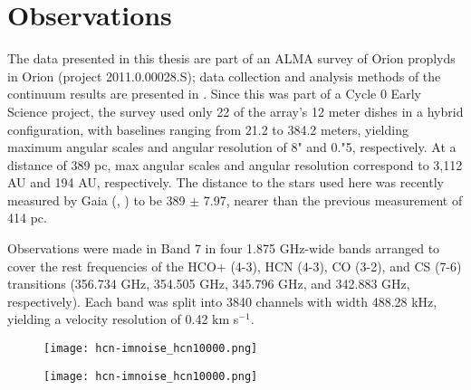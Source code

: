 \chapter{Observations}
\label{chap:observations}

The data presented in this thesis are part of an ALMA survey of Orion proplyds in Orion (project 2011.0.00028.S); data collection and analysis methods of the continuum results are presented in \citet{mann_alma_2014}. Since this was part of a Cycle 0 Early Science project, the survey used only 22 of the array's 12 meter dishes in a hybrid configuration, with baselines ranging from 21.2 to 384.2 meters, yielding maximum angular scales and angular resolution of 8" and 0."5, respectively. At a distance of 389 pc, max angular scales and angular resolution correspond to 3,112 AU and 194 AU, respectively. The distance to the stars used here was recently measured by Gaia (\citet{gaia_collaboration_gaia_2016}, \citet{gaia_collaboration_gaia_2018}) to be 389 $\pm$ 7.97, nearer than the previous measurement of 414 pc.
\bigskip

Observations were made in Band 7 in four 1.875 GHz-wide bands arranged to cover the rest frequencies of the HCO+ (4-3), HCN (4-3), CO (3-2), and CS (7-6) transitions (356.734 GHz, 354.505 GHz, 345.796 GHz, and 342.883 GHz, respectively). Each band was split into 3840 channels with width 488.28 kHz, yielding a velocity resolution of 0.42 km s$^{-1}$.

\bigskip



\begin{figure}
\centering
\begin{minipage}{.5\textwidth}
  \centering
  \texttt{[image: hcn-imnoise\_hcn10000.png]}
  \label{fig:test1}
\end{minipage}%
\begin{minipage}{.5\textwidth}
  \centering
  \texttt{[image: hcn-imnoise\_hcn10000.png]}
  \label{fig:test2}
\end{minipage}
\end{figure}




